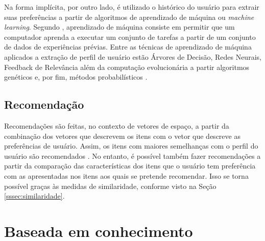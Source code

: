     Na forma implícita, por outro lado, é utilizado o histórico do usuário para extrair suas preferências a partir de algoritmos de aprendizado de máquina ou \textit{machine learning}. Segundo , aprendizado de máquina consiste em permitir que um computador aprenda a executar um conjunto de tarefas a partir de um conjunto de dados de experiências prévias.
    Entre as técnicas de aprendizado de máquina aplicados a extração de perfil de usuário estão Árvores de Decisão, Redes Neurais, Feedback de Relevância além da computação evolucionária a partir algoritmos genéticos e, por fim,  métodos probabilísticos \cite{Ricci2010}.
   
    \subsection{Recomendação}
    
    Recomendações são feitas, no contexto de vetores de espaço, a partir da combinação dos vetores que descrevem os itens com o vetor que descreve as preferências de usuário. Assim, os itens com maiores semelhanças com o perfil do usuário são recomendados \cite{Aggarwal2016}. No entanto, é possível também fazer recomendações a partir da comparação das características dos itens que o usuário tem preferência com as apresentadas nos itens aos quais se pretende recomendar. Isso se torna possível graças às medidas de similaridade, conforme visto na Seção \ref{sssec:similaridade}.

            
                
            
        
\section{Baseada em conhecimento} 
    
